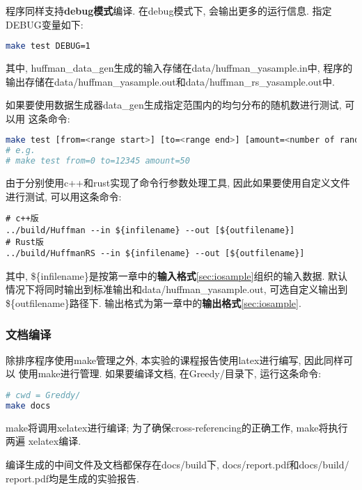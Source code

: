 程序同样支持\textbf{debug模式}编译. 在debug模式下, 会输出更多的运行信息.
指定DEBUG变量如下:
\begin{lstlisting}[language=bash]
make test DEBUG=1
\end{lstlisting}

其中, huffman\_data\_gen生成的输入存储在data/huffman\_yasample.in中,
程序的输出存储在data/huffman\_yasample.out和data/huffman\_rs\_yasample.out中. \par

如果要使用数据生成器data\_gen生成指定范围内的均匀分布的随机数进行测试, 可以用
这条命令:
\begin{lstlisting}[language=bash]
make test [from=<range start>] [to=<range end>] [amount=<number of random numbers>]
# e.g. 
# make test from=0 to=12345 amount=50
\end{lstlisting}

由于分别使用c++和rust实现了命令行参数处理工具, 因此如果要使用自定义文件进行测试,
可以用这条命令:
\begin{lstlisting}
# c++版
../build/Huffman --in ${infilename} --out [${outfilename}]
# Rust版
../build/HuffmanRS --in ${infilename} --out [${outfilename}]
\end{lstlisting}
其中, \$\{infilename\}是按第一章中的\textbf{输入格式}\ref{sec:iosample}组织的输入数据.
默认情况下将同时输出到标准输出和data/huffman\_yasample.out, 可选自定义输出到
\$\{outfilename\}路径下. 输出格式为第一章中的\textbf{输出格式}\ref{sec:iosample}.

\subsubsection{文档编译}
除排序程序使用make管理之外, 本实验的课程报告使用latex进行编写, 因此同样可以
使用make进行管理. 如果要编译文档, 在Greedy/目录下, 运行这条命令:
\begin{lstlisting}[language=bash]
# cwd = Greddy/
make docs
\end{lstlisting}
make将调用xelatex进行编译; 为了确保cross-referencing的正确工作, make将执行两遍
xelatex编译.\par
编译生成的中间文件及文档都保存在docs/build下, docs/report.pdf和docs/build/
report.pdf均是生成的实验报告.

